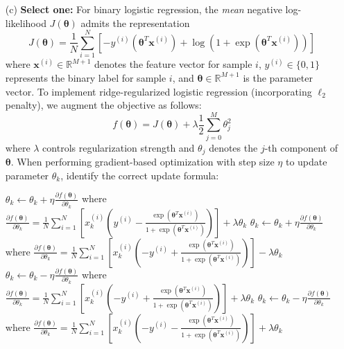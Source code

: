 \documentclass[11pt,addpoints,answers]{exam}
\newcommand{\xv}{\mathbf{x}}
\newcommand{\thetav}{\boldsymbol{\theta}}
\newcommand{\sone}{\textbf{Select one: }}
\begin{document}
\begin{enumerate}
\begin{enumerate}[label=\alph*), itemsep=10pt]
			
			
			\vspace*{1.2cm}
			
			\item[(c)] \sone For binary logistic regression, the \emph{mean} negative log-likelihood $J(\thetav)$ admits the representation
			$$J(\thetav) = \frac{1}{N}\sum_{i=1}^N  \left[-y^{(i)}\left(\thetav^T \xv^{\left(i\right)}\right)+\log\left(1+\exp(\thetav^T \xv^{\left(i\right)})\right)\right]$$
			where $\xv^{(i)}\in \mathbb{R}^{M+1}$ denotes the feature vector for sample $i$, $y^{(i)}\in\{0, 1\}$ represents the binary label for sample $i$, and $\thetav\in\mathbb{R}^{M+1}$ is the parameter vector. To implement ridge-regularized logistic regression (incorporating $\ell_2$ penalty), we augment the objective as follows:
			$$ f(\thetav) = J(\thetav) + \lambda \frac{1}{2}\sum_{j=0}^M \theta_j^2$$
			where $\lambda$ controls regularization strength and $\theta_j$ denotes the $j$-th component of $\thetav$. When performing gradient-based optimization with step size $\eta$ to update parameter $\theta_k$, identify the correct update formula:
			
			\begin{checkboxes}
				\checkboxchar{$\Box$} \checkedchar{$\blacksquare$}
				\choice 
				$\theta_k\leftarrow \theta_k + \eta \frac{\partial f(\thetav)}{\partial \theta_k}$ where 
				$ \frac{\partial f(\thetav)}{\partial \theta_k}=\frac{1}{N}\sum_{i=1}^N \left[x^{(i)}_k\left(y^{(i)} -\frac{\exp(\thetav^T \xv^{(i)})}{1+\exp(\thetav^T \xv^{(i)})} \right)\right]+\lambda \theta_k$
				\choice 
				$\theta_k\leftarrow \theta_k + \eta \frac{\partial f(\thetav)}{\partial \theta_k}$ where 
				$ \frac{\partial f(\thetav)}{\partial \theta_k}=\frac{1}{N}\sum_{i=1}^N \left[x^{(i)}_k\left(-y^{(i)} +\frac{\exp(\thetav^T \xv^{(i)})}{1+\exp(\thetav^T \xv^{(i)})} \right)\right]-\lambda \theta_k$
				\CorrectChoice
				$\theta_k\leftarrow \theta_k - \eta \frac{\partial f(\thetav)}{\partial \theta_k}$ where 
				$ \frac{\partial f(\thetav)}{\partial \theta_k}=\frac{1}{N}\sum_{i=1}^N \left[x^{(i)}_k\left(-y^{(i)} +\frac{\exp(\thetav^T \xv^{(i)})}{1+\exp(\thetav^T \xv^{(i)})} \right)\right]+\lambda \theta_k$
				\choice
				$\theta_k\leftarrow \theta_k - \eta \frac{\partial f(\thetav)}{\partial \theta_k}$ where 
				$ \frac{\partial f(\thetav)}{\partial \theta_k}=\frac{1}{N}\sum_{i=1}^N \left[x^{(i)}_k\left(-y^{(i)} -\frac{\exp(\thetav^T \xv^{(i)})}{1+\exp(\thetav^T \xv^{(i)})} \right)\right]+\lambda \theta_k$
			\end{checkboxes}
			

\end{enumerate}
\end{enumerate}
\end{document}
